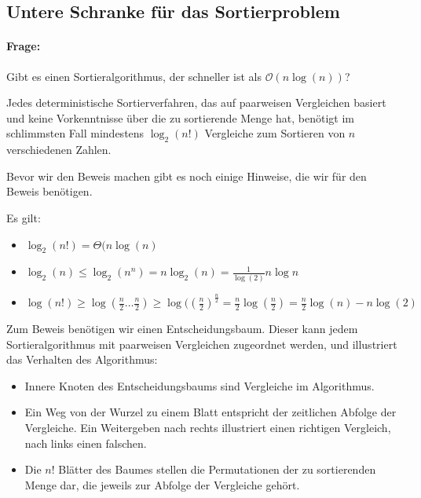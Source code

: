 \subsection{Untere Schranke für das Sortierproblem}
\paragraph{Frage:} Gibt es einen Sortieralgorithmus, der schneller ist als $\mathcal{O}(n\log(n))$?

\begin{theorem}
	\label{thm:sortierverfahren}
Jedes deterministische Sortierverfahren, das auf paarweisen Vergleichen basiert und keine Vorkenntnisse über die zu sortierende Menge hat, benötigt im schlimmsten Fall mindestens $\log_2(n!)$ Vergleiche zum Sortieren von $n$ verschiedenen Zahlen.
\end{theorem}
Bevor wir den Beweis machen gibt es noch einige Hinweise, die wir für den Beweis benötigen.
\begin{remark}
	Es gilt:
	\begin{itemize}
		\item  $\log_2(n!) = \Theta(n\log(n)$
		\item $\log_2(n) \le \log_2(n^{n}) = n\log_2(n) = \frac{1}{\log(2)}n \log n$
		\item $\log(n!) \ge \log(\frac{n}{2}\ldots \frac{n}{2}) \ge \log((\frac{n}{2})^{\frac{n}{2}}= \frac{n}{2}\log(\frac{n}{2}) = \frac{n}{2}\log(n) - n\log(2)$
	\end{itemize}
\end{remark}
Zum Beweis benötigen wir einen Entscheidungsbaum. Dieser kann jedem Sortieralgorithmus mit paarweisen Vergleichen zugeordnet werden, und illustriert das Verhalten des Algorithmus:
\begin{itemize}
	\item Innere Knoten des Entscheidungsbaums sind Vergleiche im Algorithmus.
	\item Ein Weg von der Wurzel zu einem Blatt entspricht der zeitlichen Abfolge der Vergleiche. Ein Weitergeben nach rechts illustriert einen richtigen Vergleich, nach links einen falschen.
	\item Die $n!$ Blätter des Baumes stellen die Permutationen der zu sortierenden Menge dar, die jeweils zur Abfolge der Vergleiche gehört.
\end{itemize}
